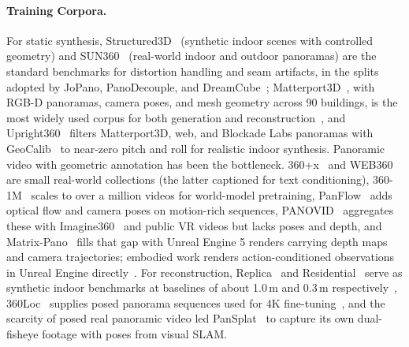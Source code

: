 \paragraph{Training Corpora.}
For static synthesis, Structured3D~\cite{zheng2020structured3d} (synthetic indoor scenes with controlled geometry) and SUN360~\cite{xiao2012recognizing} (real-world indoor and outdoor panoramas) are the standard benchmarks for distortion handling and seam artifacts, in the splits adopted by JoPano, PanoDecouple, and DreamCube~\cite{feng2025jopano,zheng2025panorama,huang2025dreamcube}; Matterport3D~\cite{chang2017matterport3d}, with RGB-D panoramas, camera poses, and mesh geometry across 90 buildings, is the most widely used corpus for both generation and reconstruction~\cite{pansplat,yang2024layerpano3d,team2025hunyuanworld,tang2023MVDiffusion,zhang2024taming}, and Upright360~\cite{yang2024layerpano3d} filters Matterport3D, web, and Blockade Labs panoramas with GeoCalib~\cite{veicht2024geocalib} to near-zero pitch and roll for realistic indoor synthesis.
Panoramic video with geometric annotation has been the bottleneck.
360+x~\cite{chen2023360plusx} and WEB360~\cite{wang2024360dvd} are small real-world collections (the latter captioned for text conditioning), 360-1M~\cite{wallingford2024image} scales to over a million videos for world-model pretraining, PanFlow~\cite{panflow} adds optical flow and camera poses on motion-rich sequences, PANOVID~\cite{xia2025panowan} aggregates these with Imagine360~\cite{tan2024imagine360} and public VR videos but lacks poses and depth, and Matrix-Pano~\cite{yang2025matrix} fills that gap with Unreal Engine 5 renders carrying depth maps and camera trajectories; embodied work renders action-conditioned observations in Unreal Engine directly~\cite{lu2024genex,yin2025panoworld}.
For reconstruction, Replica~\cite{straub2019replica} and Residential~\cite{habtegebrial2022somsi} serve as synthetic indoor benchmarks at baselines of about 1.0\,m and 0.3\,m respectively~\cite{pansplat}, 360Loc~\cite{huang2024360loc} supplies posed panorama sequences used for 4K fine-tuning~\cite{pansplat}, and the scarcity of posed real panoramic video led PanSplat~\cite{pansplat} to capture its own dual-fisheye footage with poses from visual SLAM.

